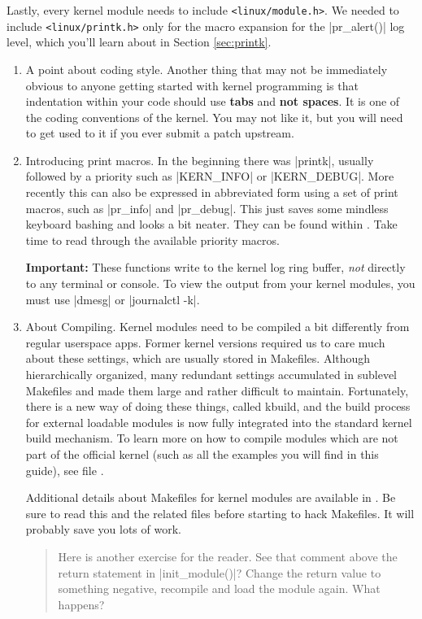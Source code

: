 \documentclass[10pt, oneside]{book}
\begin{document}
Lastly, every kernel module needs to include \verb|<linux/module.h>|.
We needed to include \verb|<linux/printk.h>| only for the macro expansion for the \cpp|pr_alert()| log level, which you'll learn about in Section \ref{sec:printk}.

\begin{enumerate}
  \item A point about coding style.
        Another thing that may not be immediately obvious to anyone getting started with kernel programming is that indentation within your code should use \textbf{tabs} and \textbf{not spaces}.
        It is one of the coding conventions of the kernel.
        You may not like it, but you will need to get used to it if you ever submit a patch upstream.

  \item Introducing print macros.
  \label{sec:printk}
        In the beginning there was \cpp|printk|, usually followed by a priority such as \cpp|KERN_INFO| or \cpp|KERN_DEBUG|.
        More recently this can also be expressed in abbreviated form using a set of print macros, such as \cpp|pr_info| and \cpp|pr_debug|.
        This just saves some mindless keyboard bashing and looks a bit neater.
        They can be found within .
        Take time to read through the available priority macros.

        \textbf{Important:} These functions write to the kernel log ring buffer, \emph{not} directly to any terminal or console.
        To view the output from your kernel modules, you must use \sh|dmesg| or \sh|journalctl -k|.

  \item About Compiling.
        Kernel modules need to be compiled a bit differently from regular userspace apps.
        Former kernel versions required us to care much about these settings, which are usually stored in Makefiles.
        Although hierarchically organized, many redundant settings accumulated in sublevel Makefiles and made them large and rather difficult to maintain.
        Fortunately, there is a new way of doing these things, called kbuild, and the build process for external loadable modules is now fully integrated into the standard kernel build mechanism.
        To learn more on how to compile modules which are not part of the official kernel (such as all the examples you will find in this guide), see file .

        Additional details about Makefiles for kernel modules are available in . Be sure to read this and the related files before starting to hack Makefiles. It will probably save you lots of work.

\begin{quote}
Here is another exercise for the reader.
See that comment above the return statement in \cpp|init_module()|?
Change the return value to something negative, recompile and load the module again.
What happens?
\end{quote}
\end{enumerate}
\end{document}

